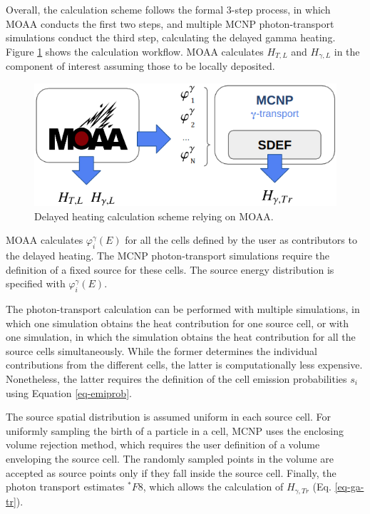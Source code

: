 Overall, the calculation scheme follows the formal 3-step process, in which MOAA conducts the first two steps, and multiple MCNP photon-transport simulations conduct the third step, calculating the delayed gamma heating.
Figure \ref{fig:workflow_3} shows the calculation workflow.
MOAA calculates $H_{T,L}$ and $H_{\gamma, L}$ in the component of interest assuming those to be locally deposited.

\begin{figure}[htbp!]
  \begin{center}
    \includegraphics[width=0.70\linewidth]{figures/heat-flow}
  \end{center}
  \caption{Delayed heating calculation scheme relying on MOAA.}
  \label{fig:workflow_3}
\end{figure}

MOAA calculates $\varphi^\gamma_i(E)$ for all the cells defined by the user as contributors to the delayed heating.
The MCNP photon-transport simulations require the definition of a fixed source for these cells.
The source energy distribution is specified with $\varphi^\gamma_i(E)$.

The photon-transport calculation can be performed with multiple simulations, in which one simulation obtains the heat contribution for one source cell, or with one simulation, in which the simulation obtains the heat contribution for all the source cells simultaneously.
While the former determines the individual contributions from the different cells, the latter is computationally less expensive.
Nonetheless, the latter requires the definition of the cell emission probabilities $s_i$ using Equation \ref{eq-emiprob}.

The source spatial distribution is assumed uniform in each source cell.
For uniformly sampling the birth of a particle in a cell, MCNP uses the enclosing volume rejection method, which requires the user definition of a volume enveloping the source cell.
The randomly sampled points in the volume are accepted as source points only if they fall inside the source cell.
Finally, the photon transport estimates $^\ast F8$, which allows the calculation of $H_{\gamma, Tr}$ (Eq. \ref{eq-ga-tr}).


